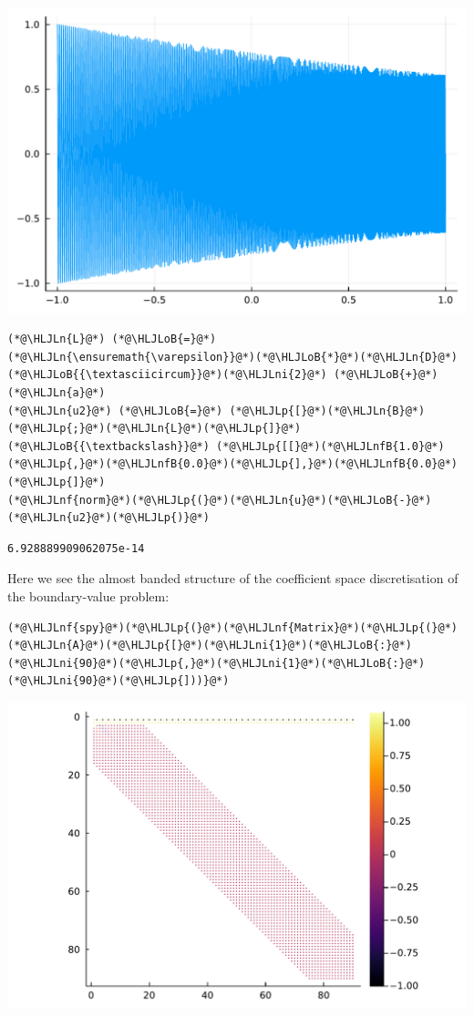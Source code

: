 \documentclass[12pt,a4paper]{article}
\newcommand{\HLJLn}[1]{#1}
\newcommand{\HLJLnf}[1]{\textcolor[RGB]{66,102,213}{#1}}
\newcommand{\HLJLnfB}[1]{\textcolor[RGB]{59,151,46}{#1}}
\newcommand{\HLJLni}[1]{\textcolor[RGB]{59,151,46}{#1}}
\newcommand{\HLJLoB}[1]{\textcolor[RGB]{102,102,102}{\textbf{#1}}}
\newcommand{\HLJLp}[1]{#1}
\begin{document}
\includegraphics[width=\linewidth]{jl_GsbqQZ/Chapter4_39_1.pdf}

\begin{lstlisting}
(*@\HLJLn{L}@*) (*@\HLJLoB{=}@*) (*@\HLJLn{\ensuremath{\varepsilon}}@*)(*@\HLJLoB{*}@*)(*@\HLJLn{D}@*)(*@\HLJLoB{{\textasciicircum}}@*)(*@\HLJLni{2}@*) (*@\HLJLoB{+}@*) (*@\HLJLn{a}@*)
(*@\HLJLn{u2}@*) (*@\HLJLoB{=}@*) (*@\HLJLp{[}@*)(*@\HLJLn{B}@*)(*@\HLJLp{;}@*)(*@\HLJLn{L}@*)(*@\HLJLp{]}@*) (*@\HLJLoB{{\textbackslash}}@*) (*@\HLJLp{[[}@*)(*@\HLJLnfB{1.0}@*)(*@\HLJLp{,}@*)(*@\HLJLnfB{0.0}@*)(*@\HLJLp{],}@*)(*@\HLJLnfB{0.0}@*)(*@\HLJLp{]}@*)
(*@\HLJLnf{norm}@*)(*@\HLJLp{(}@*)(*@\HLJLn{u}@*)(*@\HLJLoB{-}@*)(*@\HLJLn{u2}@*)(*@\HLJLp{)}@*)
\end{lstlisting}

\begin{lstlisting}
6.928889909062075e-14
\end{lstlisting}


Here we see the almost banded structure of the coefficient space discretisation of the boundary-value problem:


\begin{lstlisting}
(*@\HLJLnf{spy}@*)(*@\HLJLp{(}@*)(*@\HLJLnf{Matrix}@*)(*@\HLJLp{(}@*)(*@\HLJLn{A}@*)(*@\HLJLp{[}@*)(*@\HLJLni{1}@*)(*@\HLJLoB{:}@*)(*@\HLJLni{90}@*)(*@\HLJLp{,}@*)(*@\HLJLni{1}@*)(*@\HLJLoB{:}@*)(*@\HLJLni{90}@*)(*@\HLJLp{]))}@*)
\end{lstlisting}

\includegraphics[width=\linewidth]{jl_GsbqQZ/Chapter4_41_1.pdf}
\end{document}

